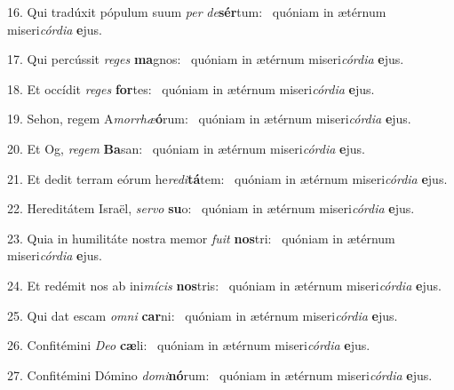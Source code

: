 16. Qui tradúxit pópulum suum \textit{per} \textit{de}\textbf{sér}tum: \ast\  quóniam in ætérnum miseri\textit{cór}\textit{di}\textit{a} \textbf{e}jus.\

17. Qui percússit \textit{re}\textit{ges} \textbf{ma}gnos: \ast\  quóniam in ætérnum miseri\textit{cór}\textit{di}\textit{a} \textbf{e}jus.\

18. Et occídit \textit{re}\textit{ges} \textbf{for}tes: \ast\  quóniam in ætérnum miseri\textit{cór}\textit{di}\textit{a} \textbf{e}jus.\

19. Sehon, regem A\textit{mor}\textit{rhæ}\textbf{ó}rum: \ast\  quóniam in ætérnum miseri\textit{cór}\textit{di}\textit{a} \textbf{e}jus.\

20. Et Og, \textit{re}\textit{gem} \textbf{Ba}san: \ast\  quóniam in ætérnum miseri\textit{cór}\textit{di}\textit{a} \textbf{e}jus.\

21. Et dedit terram eórum he\textit{re}\textit{di}\textbf{tá}tem: \ast\  quóniam in ætérnum miseri\textit{cór}\textit{di}\textit{a} \textbf{e}jus.\

22. Hereditátem Israël, \textit{ser}\textit{vo} \textbf{su}o: \ast\  quóniam in ætérnum miseri\textit{cór}\textit{di}\textit{a} \textbf{e}jus.\

23. Quia in humilitáte nostra memor \textit{fu}\textit{it} \textbf{nos}tri: \ast\  quóniam in ætérnum miseri\textit{cór}\textit{di}\textit{a} \textbf{e}jus.\

24. Et redémit nos ab ini\textit{mí}\textit{cis} \textbf{nos}tris: \ast\  quóniam in ætérnum miseri\textit{cór}\textit{di}\textit{a} \textbf{e}jus.\

25. Qui dat escam \textit{om}\textit{ni} \textbf{car}ni: \ast\  quóniam in ætérnum miseri\textit{cór}\textit{di}\textit{a} \textbf{e}jus.\

26. Confitémini \textit{De}\textit{o} \textbf{cæ}li: \ast\  quóniam in ætérnum miseri\textit{cór}\textit{di}\textit{a} \textbf{e}jus.\

27. Confitémini Dómino \textit{do}\textit{mi}\textbf{nó}rum: \ast\  quóniam in ætérnum miseri\textit{cór}\textit{di}\textit{a} \textbf{e}jus.\

